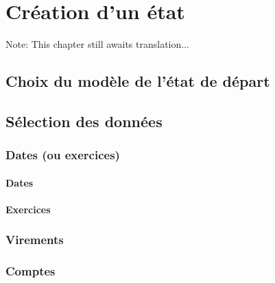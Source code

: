 
\chapter{Création d'un état\label{reportscreation}}

Note: This chapter still awaits translation...

\section{Choix du modèle de l'état de départ\label{reportscreation-start}}


\section{Sélection des données\label{reportscreation-selection}}


\subsection{Dates (ou exercices)\label{reportscreation-selection-dates}}


\subsubsection{Dates}


\subsubsection{Exercices}


\subsection{Virements\label{reportscreation-selection-transfer}}


\subsection{Comptes\label{reportscreation-selection-accounts}}


